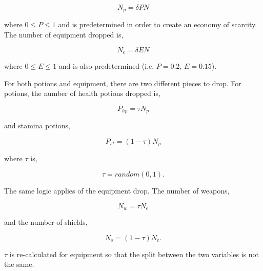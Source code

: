 \begin{equation}
    N_p = \delta P N
\end{equation}

where $0 \leq P \leq 1$ and is predetermined in order to create an economy of scarcity. The number of equipment dropped is,

\begin{equation}
    N_e = \delta E N
\end{equation}

where $0 \leq E \leq 1$ and is also predetermined (i.e. $P=0.2$, $E=0.15$). 


\noindent For both potions and equipment, there are two different pieces to drop. For potions, the number of health potions dropped is,

\begin{equation}
    P_{hp} = \tau N_p
\end{equation}

and stamina potions,

\begin{equation}
    P_{st} = (1-\tau) N_p
\end{equation}

where $\tau$ is,

\begin{equation}
    \tau = random(0,1).
\end{equation}

\noindent The same logic applies of the equipment drop. The number of weapons,

\begin{equation}
    N_w = \tau N_e
\end{equation}

and the number of shields,

\begin{equation}
    N_s = (1 - \tau) N_e. 
\end{equation}

$\tau$ is re-calculated for equipment so that the split between the two variables is not the same. 



